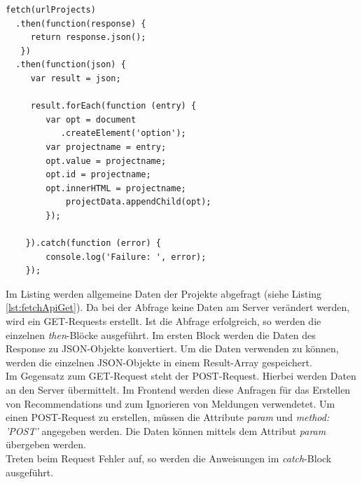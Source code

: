 \begin{samepage}%
	\begin{lstlisting}[float=tbhp]
fetch(urlProjects)
  .then(function(response) {
     return response.json();
   })
  .then(function(json) {
     var result = json;
        
  	 result.forEach(function (entry) {
        var opt = document
           .createElement('option');
        var projectname = entry;
        opt.value = projectname;
        opt.id = projectname;
        opt.innerHTML = projectname;
            projectData.appendChild(opt);
        });
        
    }).catch(function (error) {
        console.log('Failure: ', error);
    });

	\end{lstlisting}
\end{samepage}

Im Listing werden allgemeine Daten der Projekte abgefragt (siehe Listing \ref{lst:fetchApiGet}). Da bei der Abfrage keine Daten am Server verändert werden, wird ein GET-Requests erstellt. Ist die Abfrage erfolgreich, so werden die einzelnen \textit{then}-Blöcke ausgeführt. Im ersten Block werden die Daten des Response zu JSON-Objekte konvertiert. Um die Daten verwenden zu können, werden die einzelnen JSON-Objekte in einem Result-Array gespeichert.  \\
Im Gegensatz zum GET-Request steht der POST-Request. Hierbei werden Daten an den Server übermittelt. Im Frontend werden diese Anfragen für das Erstellen von Recommendations und zum Ignorieren von Meldungen verwendetet. Um einen POST-Request zu erstellen, müssen die Attribute \textit{param} und \textit{method: 'POST'} angegeben werden. Die Daten können mittels dem Attribut \textit{param} übergeben werden. \\
Treten beim Request Fehler auf, so werden die Anweisungen im \textit{catch}-Block ausgeführt.

